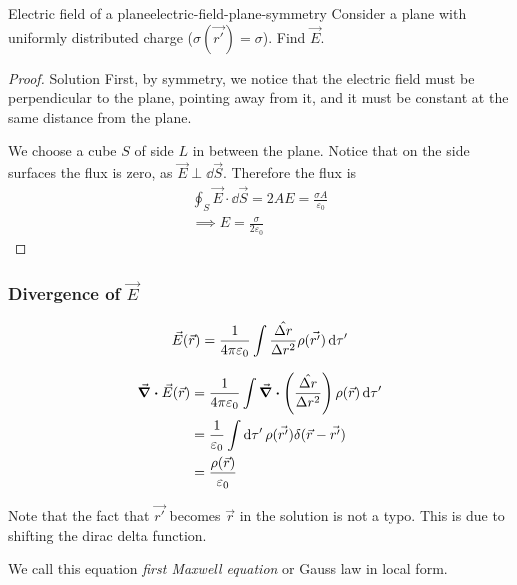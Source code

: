 \documentclass[12pt]{extarticle}
\begin{document}
\begin{example}{Electric field of a plane}{electric-field-plane-symmetry}
    Consider a plane with uniformly distributed charge ($\sigma(\vec {r'}) = \sigma$).
    Find $\vec E$.
\end{example}

\begin{proof}{Solution}
    First, by symmetry, we notice that the electric field must be perpendicular to the plane, pointing away from it, and it must be constant at the same distance from the plane.

    We choose a cube $S$ of side $L$ in between the plane.
    Notice that on the side surfaces the flux is zero, as $\vec E \perp \dd{\vec S}$.
    Therefore the flux is
    \begin{gather}
        \oint_S \vec E \cdot \dd{\vec S} = 2 A E = \frac{\sigma A}{\varepsilon_0}\\
        \implies E = \frac{\sigma}{2 \varepsilon_0}
    \end{gather}

\end{proof}

\subsubsection{Divergence of \texorpdfstring{$\vec E$}{the electric field}}

\begin{equation}
    \vec E(\vec r) = \frac{1}{4 \pi \varepsilon_0} \int \frac{\hat{\Delta r}}{\Delta r^2} \rho(\vec{r'}) \dd{\tau'}
\end{equation}

\begin{align}
    \div \vec E(\vec r) & = \frac{1}{4 \pi \varepsilon_0} \int \div \left(\frac{\hat{\Delta r}}{\Delta r^2} \right) \rho(\vec r) \dd{\tau'} \\
                        & = \frac{1}{\varepsilon_0} \int \dd{\tau'} \rho(\vec{r'}) \delta(\vec r - \vec{r'})                                \\
                        & = \frac{\rho(\vec r)}{\varepsilon_0}
\end{align}

Note that the fact that $\vec {r'}$ becomes $\vec r$ in the solution is not a typo. This is due to shifting the dirac delta function.

We call this equation \emph{first Maxwell equation} or Gauss law in local form.
\end{document}
